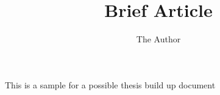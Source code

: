 \documentclass[11pt, oneside]{article}   	%
\title{Brief Article}
\author{The Author}
\begin{document}
\maketitle
This is a sample for a possible thesis
build up document


\end{document}
